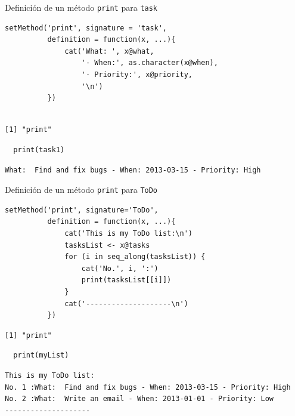 \documentclass[xcolor={usenames,svgnames,dvipsnames}]{beamer}
\begin{document}
\begin{frame}[fragile,label={sec:org0866156}]{Definición de un método \texttt{print} para \texttt{task}}
 \lstset{language=r,label= ,caption= ,captionpos=b,numbers=none}
\begin{lstlisting}
setMethod('print', signature = 'task',
          definition = function(x, ...){
              cat('What: ', x@what,
                  '- When:', as.character(x@when),
                  '- Priority:', x@priority,
                  '\n')
          })
  
\end{lstlisting}

\begin{verbatim}
[1] "print"
\end{verbatim}


\lstset{language=r,label= ,caption= ,captionpos=b,numbers=none}
\begin{lstlisting}
  print(task1)
\end{lstlisting}

\begin{verbatim}
What:  Find and fix bugs - When: 2013-03-15 - Priority: High
\end{verbatim}
\end{frame}

\begin{frame}[fragile,label={sec:orgfa05bc3}]{Definición de un método \texttt{print} para \texttt{ToDo}}
 \lstset{language=r,label= ,caption= ,captionpos=b,numbers=none}
\begin{lstlisting}
setMethod('print', signature='ToDo',
          definition = function(x, ...){
              cat('This is my ToDo list:\n')
              tasksList <- x@tasks
              for (i in seq_along(tasksList)) {
                  cat('No.', i, ':')
                  print(tasksList[[i]])
              }
              cat('--------------------\n')
          })
\end{lstlisting}

\begin{verbatim}
[1] "print"
\end{verbatim}

\lstset{language=r,label= ,caption= ,captionpos=b,numbers=none}
\begin{lstlisting}
  print(myList)
\end{lstlisting}

\begin{verbatim}
This is my ToDo list:
No. 1 :What:  Find and fix bugs - When: 2013-03-15 - Priority: High 
No. 2 :What:  Write an email - When: 2013-01-01 - Priority: Low 
--------------------
\end{verbatim}
\end{frame}
\end{document}

